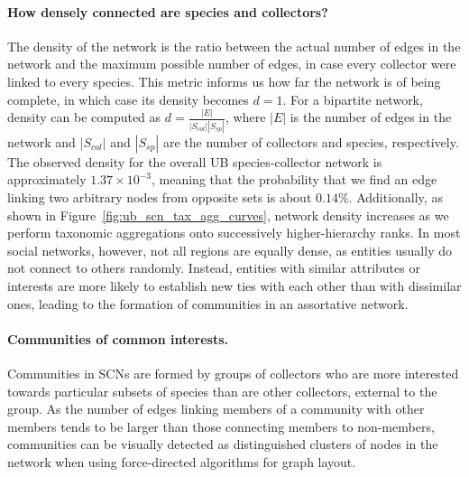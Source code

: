 \paragraph{How densely connected are species and collectors?}
The density of the network is the ratio between the actual number of edges in the network and the maximum possible number of edges, in case every collector were linked to every species. This metric informs us how far the network is of being complete, in which case its density becomes $d=1$. For a bipartite network, density can be computed as $d = \frac{|E|}{|S_{col}| |S_{sp}|}$, where $|E|$ is the number of edges in the network and $|S_{col}|$ and $|S_{sp}|$ are the number of collectors and species, respectively.
%
The observed density for the overall UB species-collector network is approximately $1.37 \times 10^{-3}$, meaning that the probability that we find an edge linking two arbitrary nodes from opposite sets is about $0.14\%$. Additionally, as shown in Figure~\ref{fig:ub_scn_tax_agg_curves}, network density increases as we perform taxonomic aggregations onto successively higher-hierarchy ranks.
%
In most social networks, however, not all regions are equally dense, as entities usually do not connect to others randomly. Instead, entities with similar attributes or interests are more likely to establish new ties with each other than with dissimilar ones, leading to the formation of communities in an assortative network.

\paragraph{Communities of common interests.}
Communities in SCNs are formed by groups of collectors who are more interested towards particular subsets of species than are other collectors, external to the group.
As the number of edges linking members of a community with other members tends to be larger than those connecting members to non-members, communities can be visually detected as distinguished clusters of nodes in the network when using force-directed algorithms \cite{Jacomy2014} for graph layout.


